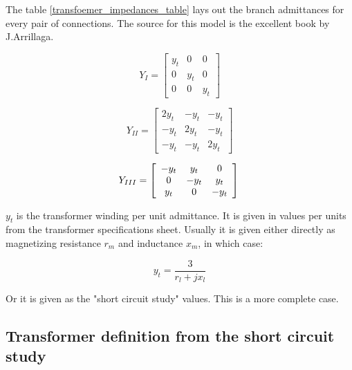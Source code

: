 \documentclass[a4paper,twoside]{tufte-book}
\begin{document}
The table \ref{transfoemer_impedances_table} lays out the branch admittances for every pair of connections. The source for this model is the excellent book by J.Arrillaga\cite{arrillaga1990computer}.

\begin{equation}
Y_{I} = \left[ \begin{array}{ccc}
y_t & 0 &  0 \\
0 & y_t & 0 \\ 
0 & 0 & y_t
\end{array} \right] 
\end{equation}

\begin{equation}
Y_{II} = \left[ \begin{array}{ccc}
2y_t & -y_t &  -y_t \\
-y_t & 2y_t & -y_t \\  
-y_t & -y_t & 2y_t
\end{array} \right] 
\end{equation}

\begin{equation}
Y_{III} = \left[ \begin{array}{ccc}
-y_t & y_t &  0 \\
0 & -y_t & y_t \\ 
y_t & 0 & -y_t
\end{array} \right] \newline
\end{equation}


$y_t$ is the transformer winding per unit admittance. It is given in values per units from the transformer specifications sheet. Usually it is given either directly as magnetizing resistance $r_m$ and inductance $x_m$, in which case:

\begin{equation}
y_t = \frac{3}{r_l + jx_l}
\end{equation}

Or it is given as the "short circuit study" values. This is a more complete case.



\subsection{Transformer definition from the short circuit study}
\end{document}
